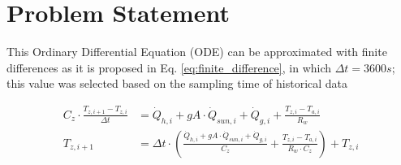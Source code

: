 \section{Problem Statement}
\label{sec:problem_statement}

%
%
%
%
%


This Ordinary Differential Equation (ODE) can be approximated with finite differences as it is proposed in Eq. \ref{eq:finite_difference}, in which $\Delta t = 3600s$; this value was selected based on the sampling time of historical data

\begin{align}
C_z \cdot \frac{T_{z,i+1}-T_{z,i}}{\Delta t} &= \dot{Q}_{h,i} + gA \cdot \dot{Q}_{sun, i} + \dot{Q}_{g,i}  + \frac{T_{z,i}-T_{a,i}}{R_w}\\
T_{z,i+1} &= \Delta t \cdot \left( \frac{\dot{Q}_{h,i} + gA \cdot \dot{Q}_{sun, i} + \dot{Q}_{g,i}}{C_z} + \frac{T_{z,i}-T_{a,i}}{R_w \cdot C_z} \right) + T_{z,i}
\label{eq:finite_difference}
\end{align}